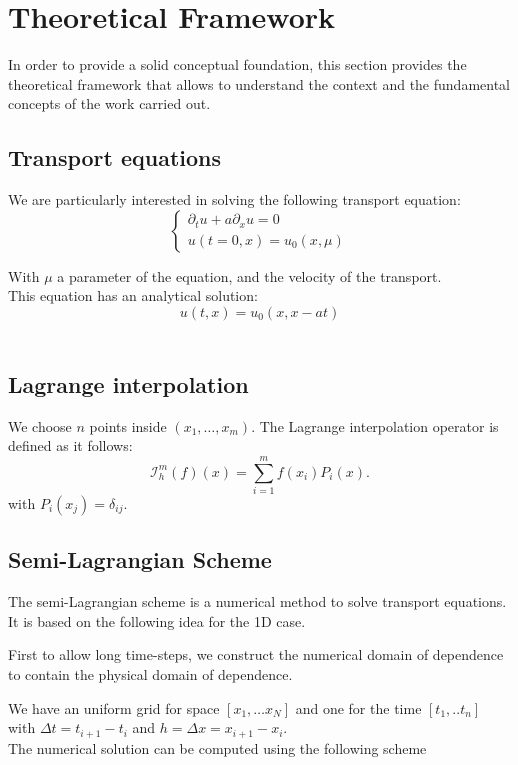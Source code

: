 \documentclass{article}
\begin{document}
\section{Theoretical Framework}

In order to provide a solid conceptual foundation, this section provides the theoretical framework that allows to understand the context and the fundamental concepts of the work carried out. 
\subsection{Transport equations}


We are particularly interested in solving the following transport equation:
\[
\begin{cases}
\partial_t u + a \partial_x u = 0 \\
u(t=0, x) = u_0(x, \mu)
\end{cases}
\]

With $\mu$ a parameter of the equation, and the velocity of the transport.\\

This equation has an analytical solution:
$$
u(t, x)=u_0(x, x-at)
$$
\
\subsection{Lagrange interpolation}

We choose $n$ points inside $\left(x_1, \ldots, x_m\right)$.
The Lagrange interpolation operator is defined as it follows:
$$
\mathcal{I}_h^m(f)(x)=\sum_{i=1}^m f\left(x_i\right) P_i(x).
$$
with $P_i\left(x_j\right)=\delta_{i j}.$


\subsection{Semi-Lagrangian Scheme}


The semi-Lagrangian scheme is a numerical method to solve transport equations. It is based on the following idea for the 1D case.


First to allow long time-steps, we construct the numerical domain of dependence to contain the physical domain of dependence.


We have an uniform grid for space $\left[x_1, \ldots x_N\right]$ and one  for the time $\left[t_1, . . t_n\right]$ with $\Delta t=t_{i+1}-t_i$ and $ h = \Delta x=x_{i+1}-x_i$.\\
The numerical solution can be computed using the following scheme
\end{document}
